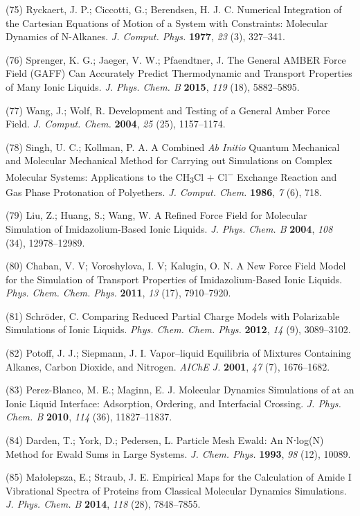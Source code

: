 \documentclass[]{article}
\begin{document}
(75) Ryckaert, J. P.; Ciccotti, G.; Berendsen, H. J. C. Numerical
Integration of the Cartesian Equations of Motion of a System with
Constraints: Molecular Dynamics of N-Alkanes. \emph{J. Comput. Phys.}
\textbf{1977}, \emph{23} (3), 327--341.

(76) Sprenger, K. G.; Jaeger, V. W.; Pfaendtner, J. The General AMBER
Force Field (GAFF) Can Accurately Predict Thermodynamic and Transport
Properties of Many Ionic Liquids. \emph{J. Phys. Chem. B} \textbf{2015},
\emph{119} (18), 5882--5895.

(77) Wang, J.; Wolf, R. Development and Testing of a General Amber Force
Field. \emph{J. Comput. Chem.} \textbf{2004}, \emph{25} (25),
1157--1174.

(78) Singh, U. C.; Kollman, P. A. A Combined \emph{Ab Initio} Quantum
Mechanical and Molecular Mechanical Method for Carrying out Simulations
on Complex Molecular Systems: Applications to the CH\textsubscript{3}Cl
+ Cl\textsuperscript{−} Exchange Reaction and Gas Phase Protonation of
Polyethers. \emph{J. Comput. Chem.} \textbf{1986}, \emph{7} (6), 718.

(79) Liu, Z.; Huang, S.; Wang, W. A Refined Force Field for Molecular
Simulation of Imidazolium-Based Ionic Liquids. \emph{J. Phys. Chem. B}
\textbf{2004}, \emph{108} (34), 12978--12989.

(80) Chaban, V. V; Voroshylova, I. V; Kalugin, O. N. A New Force Field
Model for the Simulation of Transport Properties of Imidazolium-Based
Ionic Liquids. \emph{Phys. Chem. Chem. Phys.} \textbf{2011}, \emph{13}
(17), 7910--7920.

(81) Schröder, C. Comparing Reduced Partial Charge Models with
Polarizable Simulations of Ionic Liquids. \emph{Phys. Chem. Chem. Phys.}
\textbf{2012}, \emph{14} (9), 3089--3102.

(82) Potoff, J. J.; Siepmann, J. I. Vapor--liquid Equilibria of Mixtures
Containing Alkanes, Carbon Dioxide, and Nitrogen. \emph{AIChE J.}
\textbf{2001}, \emph{47} (7), 1676--1682.

(83) Perez-Blanco, M. E.; Maginn, E. J. Molecular Dynamics Simulations
of  at an Ionic Liquid Interface: Adsorption,
Ordering, and Interfacial Crossing. \emph{J. Phys. Chem. B}
\textbf{2010}, \emph{114} (36), 11827--11837.

(84) Darden, T.; York, D.; Pedersen, L. Particle Mesh Ewald: An N⋅log(N)
Method for Ewald Sums in Large Systems. \emph{J. Chem. Phys.}
\textbf{1993}, \emph{98} (12), 10089.

(85) Małolepsza, E.; Straub, J. E. Empirical Maps for the Calculation of
Amide I Vibrational Spectra of Proteins from Classical Molecular
Dynamics Simulations. \emph{J. Phys. Chem. B} \textbf{2014}, \emph{118}
(28), 7848--7855.
\end{document}
